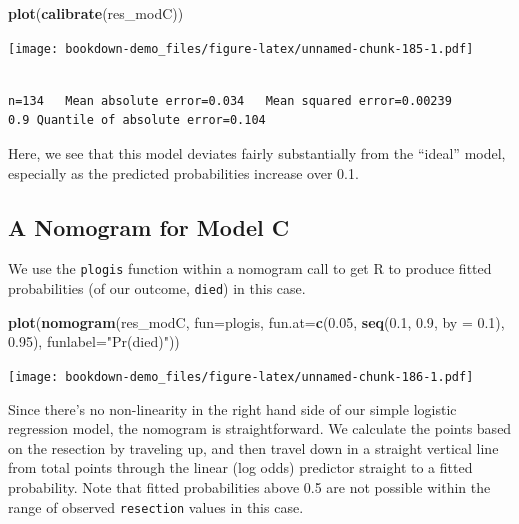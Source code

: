 \documentclass[]{book}
\newenvironment{Shaded}{\begin{snugshade}}{\end{snugshade}}
\newcommand{\KeywordTok}[1]{\textcolor[rgb]{0.13,0.29,0.53}{\textbf{#1}}}
\newcommand{\DataTypeTok}[1]{\textcolor[rgb]{0.13,0.29,0.53}{#1}}
\newcommand{\FloatTok}[1]{\textcolor[rgb]{0.00,0.00,0.81}{#1}}
\newcommand{\StringTok}[1]{\textcolor[rgb]{0.31,0.60,0.02}{#1}}
\newcommand{\NormalTok}[1]{#1}
\theoremstyle{definition}
\theoremstyle{definition}
\theoremstyle{definition}
\theoremstyle{remark}
\begin{document}
\begin{Shaded}
\begin{Highlighting}[]
\KeywordTok{plot}\NormalTok{(}\KeywordTok{calibrate}\NormalTok{(res_modC))}
\end{Highlighting}
\end{Shaded}

\texttt{[image: bookdown-demo\_files/figure-latex/unnamed-chunk-185-1.pdf]}

\begin{verbatim}

n=134   Mean absolute error=0.034   Mean squared error=0.00239
0.9 Quantile of absolute error=0.104
\end{verbatim}

Here, we see that this model deviates fairly substantially from the
``ideal'' model, especially as the predicted probabilities increase over
0.1.

\subsection{A Nomogram for Model C}\label{a-nomogram-for-model-c}

We use the \texttt{plogis} function within a nomogram call to get R to
produce fitted probabilities (of our outcome, \texttt{died}) in this
case.

\begin{Shaded}
\begin{Highlighting}[]
\KeywordTok{plot}\NormalTok{(}\KeywordTok{nomogram}\NormalTok{(res_modC, }\DataTypeTok{fun=}\NormalTok{plogis, }
              \DataTypeTok{fun.at=}\KeywordTok{c}\NormalTok{(}\FloatTok{0.05}\NormalTok{, }\KeywordTok{seq}\NormalTok{(}\FloatTok{0.1}\NormalTok{, }\FloatTok{0.9}\NormalTok{, }\DataTypeTok{by =} \FloatTok{0.1}\NormalTok{), }\FloatTok{0.95}\NormalTok{), }
              \DataTypeTok{funlabel=}\StringTok{"Pr(died)"}\NormalTok{))}
\end{Highlighting}
\end{Shaded}

\texttt{[image: bookdown-demo\_files/figure-latex/unnamed-chunk-186-1.pdf]}

Since there's no non-linearity in the right hand side of our simple
logistic regression model, the nomogram is straightforward. We calculate
the points based on the resection by traveling up, and then travel down
in a straight vertical line from total points through the linear (log
odds) predictor straight to a fitted probability. Note that fitted
probabilities above 0.5 are not possible within the range of observed
\texttt{resection} values in this case.
\end{document}
